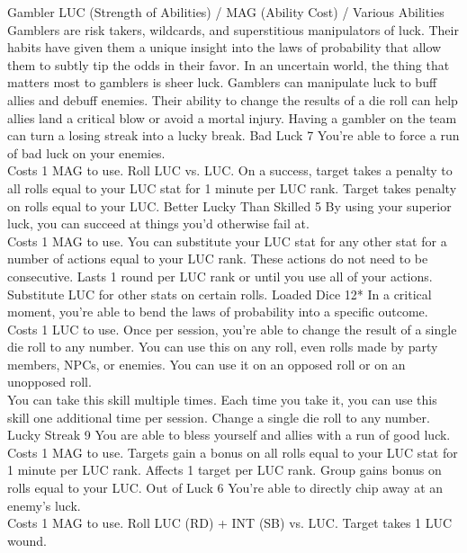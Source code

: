 ﻿\begin{path}
{Gambler}
{LUC (Strength of Abilities) / MAG (Ability Cost) / Various Abilities}
{Gamblers are risk takers, wildcards, and superstitious manipulators of luck. Their habits have given them a unique insight into the laws of probability that allow them to subtly tip the odds in their favor. In an uncertain world, the thing that matters most to gamblers is sheer luck.}
{Gamblers can manipulate luck to buff allies and debuff enemies. Their ability to change the results of a die roll can help allies land a critical blow or avoid a mortal injury. Having a gambler on the team can turn a losing streak into a lucky break. }
\skilldescription
{Bad Luck}
{7}
{You're able to force a run of bad luck on your enemies.
\\Costs 1 MAG to use. Roll LUC vs. LUC. On a success, target takes a penalty to all rolls equal to your LUC stat for 1 minute per LUC rank.}
{Target takes penalty on rolls equal to your LUC.}
\skilldescription
{Better Lucky Than Skilled}
{5}
{By using your superior luck, you can succeed at things you'd otherwise fail at.
\\Costs 1 MAG to use. You can substitute your LUC stat for any other stat for a number of actions equal to your LUC rank. These actions do not need to be consecutive. Lasts 1 round per LUC rank or until you use all of your actions.}
{Substitute LUC for other stats on certain rolls.}
\skilldescription
{Loaded Dice}
{12*}
{In a critical moment, you're able to bend the laws of probability into a specific outcome.
\\Costs 1 LUC to use. Once per session, you're able to change the result of a single die roll to any number. You can use this on any roll, even rolls made by party members, NPCs, or enemies. You can use it on an opposed roll or on an unopposed roll.
\\You can take this skill multiple times. Each time you take it, you can use this skill one additional time per session.}
{Change a single die roll to any number.}
\skilldescription
{Lucky Streak}
{9}
{You are able to bless yourself and allies with a run of good luck.
\\Costs 1 MAG to use. Targets gain a bonus on all rolls equal to your LUC stat for 1 minute per LUC rank. Affects 1 target per LUC rank.}
{Group gains bonus on rolls equal to your LUC.}
\skilldescription
{Out of Luck}
{6}
{You're able to directly chip away at an enemy's luck.
\\Costs 1 MAG to use. Roll LUC (RD) + INT (SB) vs. LUC. Target takes 1 LUC wound.}

\end{path}
